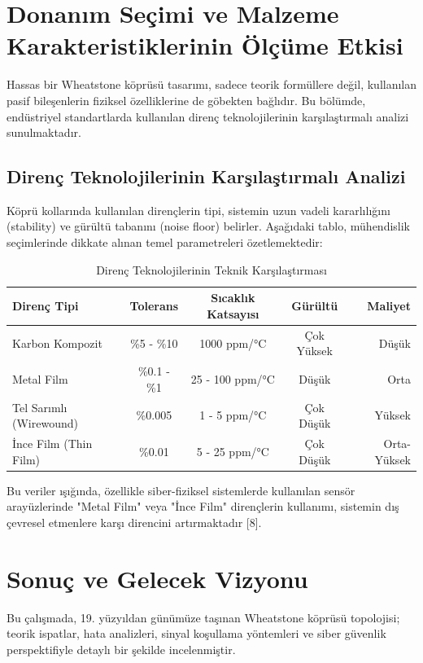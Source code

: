 \documentclass[12pt,a4paper]{article}
\begin{document}
\section{Donanım Seçimi ve Malzeme Karakteristiklerinin Ölçüme Etkisi}
Hassas bir Wheatstone köprüsü tasarımı, sadece teorik formüllere değil, kullanılan pasif bileşenlerin fiziksel özelliklerine de göbekten bağlıdır. Bu bölümde, endüstriyel standartlarda kullanılan direnç teknolojilerinin karşılaştırmalı analizi sunulmaktadır.

\subsection{Direnç Teknolojilerinin Karşılaştırmalı Analizi}
Köprü kollarında kullanılan dirençlerin tipi, sistemin uzun vadeli kararlılığını (stability) ve gürültü tabanını (noise floor) belirler. Aşağıdaki tablo, mühendislik seçimlerinde dikkate alınan temel parametreleri özetlemektedir:

\begin{table}[h!]
    \centering
    \caption{Direnç Teknolojilerinin Teknik Karşılaştırması}
    \vspace{0.5cm}
    \begin{tabular}{|l|c|c|c|r|}
        \hline
        \textbf{Direnç Tipi} & \textbf{Tolerans} & \textbf{Sıcaklık Katsayısı} & \textbf{Gürültü} & \textbf{Maliyet} \\ \hline
        Karbon Kompozit & \%5 - \%10 & 1000 ppm/°C & Çok Yüksek & Düşük \\ \hline
        Metal Film & \%0.1 - \%1 & 25 - 100 ppm/°C & Düşük & Orta \\ \hline
        Tel Sarımlı (Wirewound) & \%0.005 & 1 - 5 ppm/°C & Çok Düşük & Yüksek \\ \hline
        İnce Film (Thin Film) & \%0.01 & 5 - 25 ppm/°C & Çok Düşük & Orta-Yüksek \\ \hline
    \end{tabular}
\end{table}

Bu veriler ışığında, özellikle siber-fiziksel sistemlerde kullanılan sensör arayüzlerinde "Metal Film" veya "İnce Film" dirençlerin kullanımı, sistemin dış çevresel etmenlere karşı direncini artırmaktadır [8].

\section{Sonuç ve Gelecek Vizyonu}
Bu çalışmada, 19. yüzyıldan günümüze taşınan Wheatstone köprüsü topolojisi; teorik ispatlar, hata analizleri, sinyal koşullama yöntemleri ve siber güvenlik perspektifiyle detaylı bir şekilde incelenmiştir.
\end{document}
